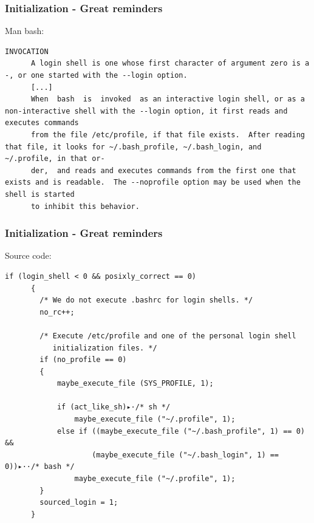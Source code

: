 \documentclass[aspectratio=169,10pt]{beamer}
\begin{document}
\begin{frame}[fragile]
  \frametitle{Initialization - Great reminders}
  Man bash:
  \vspace{\baselineskip}
    \begin{lstlisting}[basicstyle=\scriptsize,]
      INVOCATION
      A login shell is one whose first character of argument zero is a -, or one started with the --login option.
      [...]
      When  bash  is  invoked  as an interactive login shell, or as a non-interactive shell with the --login option, it first reads and executes commands
      from the file /etc/profile, if that file exists.  After reading that file, it looks for ~/.bash_profile, ~/.bash_login, and ~/.profile, in that or‐
      der,  and reads and executes commands from the first one that exists and is readable.  The --noprofile option may be used when the shell is started
      to inhibit this behavior.
    \end{lstlisting}
\end{frame}

\begin{frame}[fragile]
  \frametitle{Initialization - Great reminders}
    Source code:
    \vspace{\baselineskip}
    \begin{lstlisting}[basicstyle=\scriptsize,]
      if (login_shell < 0 && posixly_correct == 0)
      {
        /* We do not execute .bashrc for login shells. */
        no_rc++;

        /* Execute /etc/profile and one of the personal login shell
           initialization files. */
        if (no_profile == 0)
        {
            maybe_execute_file (SYS_PROFILE, 1);

            if (act_like_sh)▸·/* sh */
                maybe_execute_file ("~/.profile", 1);
            else if ((maybe_execute_file ("~/.bash_profile", 1) == 0) &&
                    (maybe_execute_file ("~/.bash_login", 1) == 0))▸··/* bash */
                maybe_execute_file ("~/.profile", 1);
        }
        sourced_login = 1;
      }
    \end{lstlisting}
\end{frame}
\end{document}
